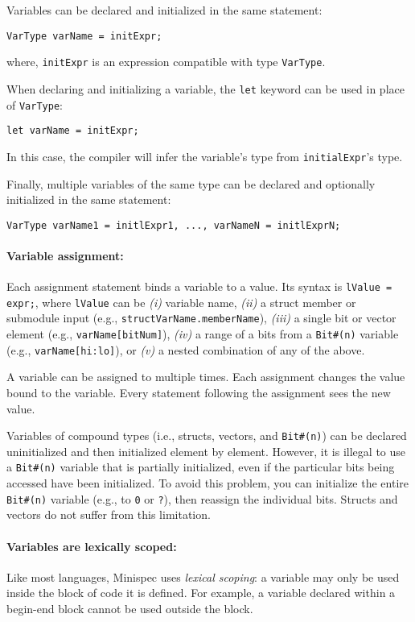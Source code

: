 Variables can be declared and initialized in the same statement:
\begin{center}
\verb|VarType varName = initExpr;|
\end{center}
where, \verb|initExpr| is an expression compatible with type \verb|VarType|.

When declaring and initializing a variable, the \verb|let| keyword can be used in place of \verb|VarType|:
\begin{center}
\verb|let varName = initExpr;|
\end{center}
In this case, the compiler will infer the variable's type from \verb|initialExpr|'s type.

Finally, multiple variables of the same type can be declared and optionally initialized in the same statement:
\begin{center}
\verb|VarType varName1 = initlExpr1, ..., varNameN = initlExprN;|
\end{center}

\paragraph{Variable assignment:} Each assignment statement binds a variable to a value. Its syntax is %
\verb|lValue = expr;|,
where \verb|lValue| can be \emph{(i)} variable name,
\emph{(ii)} a struct member or submodule input (e.g., \verb|structVarName.memberName|),
\emph{(iii)} a single bit or vector element (e.g., \verb|varName[bitNum]|),
\emph{(iv)} a range of a bits from a \verb|Bit#(n)| variable (e.g., \verb|varName[hi:lo]|),
or \emph{(v)} a nested combination of any of the above.

A variable can be assigned to multiple times. Each assignment changes the value bound to the variable.
Every statement following the assignment sees the new value.

Variables of compound types (i.e., structs, vectors, and \verb|Bit#(n)|)
can be declared uninitialized and then initialized element by element.
However, it is illegal to use a \verb|Bit#(n)| variable that is partially initialized,
even if the particular bits being accessed have been initialized.
To avoid this problem, you can initialize the entire \verb|Bit#(n)| variable
(e.g., to \verb|0| or \verb|?|), then reassign the individual bits.
Structs and vectors do not suffer from this limitation.

\paragraph{Variables are lexically scoped:}
Like most languages, Minispec uses \emph{lexical scoping}: a variable may only be used inside the block of code it is defined.
For example, a variable declared within a begin-end block cannot be used outside the block.

